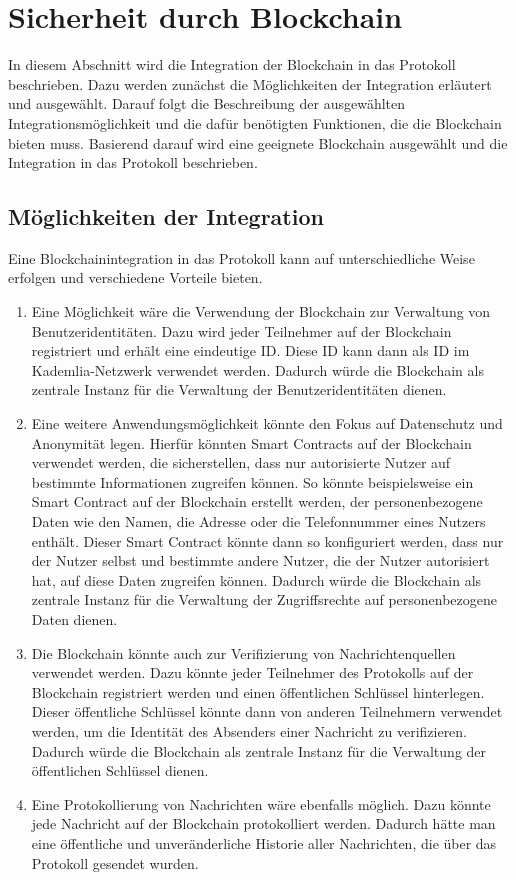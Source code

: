 \section{Sicherheit durch Blockchain}
\label{sec:blockchainintegration}

In diesem Abschnitt wird die Integration der Blockchain in das Protokoll beschrieben. Dazu werden zunächst die Möglichkeiten der Integration erläutert und ausgewählt. Darauf folgt die Beschreibung der ausgewählten Integrationsmöglichkeit und die dafür benötigten Funktionen, die die Blockchain bieten muss. Basierend darauf wird eine geeignete Blockchain ausgewählt und die Integration in das Protokoll beschrieben.

\subsection{Möglichkeiten der Integration}

Eine Blockchainintegration in das Protokoll kann auf unterschiedliche Weise erfolgen und verschiedene Vorteile bieten.

\begin{enumerate}
    \item \label{first} Eine Möglichkeit wäre die Verwendung der Blockchain zur Verwaltung von Benutzeridentitäten. Dazu wird jeder Teilnehmer auf der Blockchain registriert und erhält eine eindeutige ID. Diese ID kann dann als ID im Kademlia-Netzwerk verwendet werden. Dadurch würde die Blockchain als zentrale Instanz für die Verwaltung der Benutzeridentitäten dienen.
    \item \label{second} Eine weitere Anwendungsmöglichkeit könnte den Fokus auf Datenschutz und Anonymität legen. Hierfür könnten Smart Contracts auf der Blockchain verwendet werden, die sicherstellen, dass nur autorisierte Nutzer auf bestimmte Informationen zugreifen können. So könnte beispielsweise ein Smart Contract auf der Blockchain erstellt werden, der personenbezogene Daten wie den Namen, die Adresse oder die Telefonnummer eines Nutzers enthält. Dieser Smart Contract könnte dann so konfiguriert werden, dass nur der Nutzer selbst und bestimmte andere Nutzer, die der Nutzer autorisiert hat, auf diese Daten zugreifen können. Dadurch würde die Blockchain als zentrale Instanz für die Verwaltung der Zugriffsrechte auf personenbezogene Daten dienen.
    \item \label{three} Die Blockchain könnte auch zur Verifizierung von Nachrichtenquellen verwendet werden. Dazu könnte jeder Teilnehmer des Protokolls auf der Blockchain registriert werden und einen öffentlichen Schlüssel hinterlegen. Dieser öffentliche Schlüssel könnte dann von anderen Teilnehmern verwendet werden, um die Identität des Absenders einer Nachricht zu verifizieren. Dadurch würde die Blockchain als zentrale Instanz für die Verwaltung der öffentlichen Schlüssel dienen.
    \item \label{four} Eine Protokollierung von Nachrichten wäre ebenfalls möglich. Dazu könnte jede Nachricht auf der Blockchain protokolliert werden. Dadurch hätte man eine öffentliche und unveränderliche Historie aller Nachrichten, die über das Protokoll gesendet wurden.
\end{enumerate}

